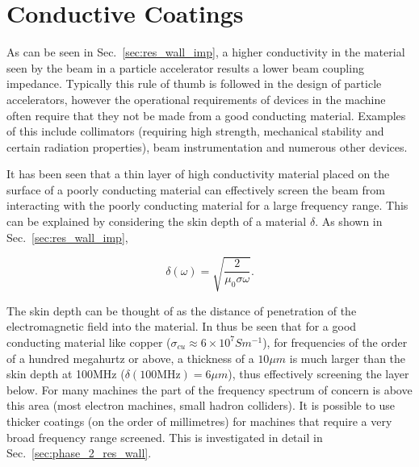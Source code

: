 \section{Conductive Coatings}
\label{sec:conductive_coatings}

As can be seen in Sec.~\ref{sec:res_wall_imp}, a higher conductivity in the material seen by the beam in a particle accelerator results a lower beam coupling impedance. Typically this rule of thumb is followed in the design of particle accelerators, however the operational requirements of devices in the machine often require that they not be made from a good conducting material. Examples of this include collimators (requiring high strength, mechanical stability and certain radiation properties),  beam instrumentation and numerous other devices.

It has been seen \cite{Caspers:ThinCondLayers} that a thin layer of high conductivity material placed on the surface of a poorly conducting material can effectively screen the beam from interacting with the poorly conducting material for a large frequency range. This can be explained by considering the skin depth of a material $\delta$. As shown in Sec.~\ref{sec:res_wall_imp}, 

\begin{equation}
\delta \left( \omega \right) = \sqrt{\frac{2}{\mu_{0} \sigma \omega}}.
\end{equation}

The skin depth can be thought of as the distance of penetration of the electromagnetic field into the material. In thus be seen that for a good conducting material like copper ($\sigma_{cu} \approx 6 \times 10^{7} S m^{-1}$), for frequencies of the order of a hundred megahurtz or above, a thickness of a $10\mu m$ is much larger than the skin depth at 100MHz ($\delta \left( 100\text{MHz} \right) = 6\mu m$), thus effectively screening the layer below. For many machines the part of the frequency spectrum of concern is above this area (most electron machines, small hadron colliders). It is possible to use thicker coatings (on the order of millimetres) for machines that require a very broad frequency range screened. This is investigated in detail in Sec.~\ref{sec:phase_2_res_wall}.

